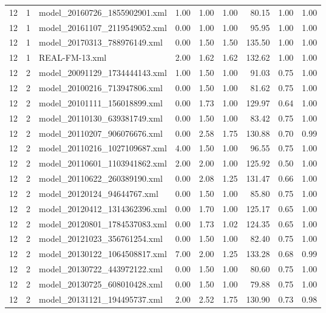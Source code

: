 \begin{table}[ht]
\begin{tabular}{rrlrrrrrr}
   12 &   1 & model\_20160726\_1855902901.xml & 1.00 & 1.00 & 1.00 & 80.15 & 1.00 & 1.00 \\ 
   12 &   1 & model\_20161107\_2119549052.xml & 0.00 & 1.00 & 1.00 & 95.95 & 1.00 & 1.00 \\ 
   12 &   1 & model\_20170313\_788976149.xml & 0.00 & 1.50 & 1.50 & 135.50 & 1.00 & 1.00 \\ 
   12 &   1 & REAL-FM-13.xml & 2.00 & 1.62 & 1.62 & 132.62 & 1.00 & 1.00 \\ 
   12 &   2 & model\_20091129\_1734444143.xml & 1.00 & 1.50 & 1.00 & 91.03 & 0.75 & 1.00 \\ 
   12 &   2 & model\_20100216\_713947806.xml & 0.00 & 1.50 & 1.00 & 81.62 & 0.75 & 1.00 \\ 
   12 &   2 & model\_20101111\_156018899.xml & 0.00 & 1.73 & 1.00 & 129.97 & 0.64 & 1.00 \\ 
   12 &   2 & model\_20110130\_639381749.xml & 0.00 & 1.50 & 1.00 & 83.42 & 0.75 & 1.00 \\ 
   12 &   2 & model\_20110207\_906076676.xml & 0.00 & 2.58 & 1.75 & 130.88 & 0.70 & 0.99 \\ 
   12 &   2 & model\_20110216\_1027109687.xml & 4.00 & 1.50 & 1.00 & 96.55 & 0.75 & 1.00 \\ 
   12 &   2 & model\_20110601\_1103941862.xml & 2.00 & 2.00 & 1.00 & 125.92 & 0.50 & 1.00 \\ 
   12 &   2 & model\_20110622\_260389190.xml & 0.00 & 2.08 & 1.25 & 131.47 & 0.66 & 1.00 \\ 
   12 &   2 & model\_20120124\_94644767.xml & 0.00 & 1.50 & 1.00 & 85.80 & 0.75 & 1.00 \\ 
   12 &   2 & model\_20120412\_1314362396.xml & 0.00 & 1.70 & 1.00 & 125.17 & 0.65 & 1.00 \\ 
   12 &   2 & model\_20120801\_1784537083.xml & 0.00 & 1.73 & 1.02 & 124.35 & 0.65 & 1.00 \\ 
   12 &   2 & model\_20121023\_356761254.xml & 0.00 & 1.50 & 1.00 & 82.40 & 0.75 & 1.00 \\ 
   12 &   2 & model\_20130122\_1064508817.xml & 7.00 & 2.00 & 1.25 & 133.28 & 0.68 & 0.99 \\ 
   12 &   2 & model\_20130722\_443972122.xml & 0.00 & 1.50 & 1.00 & 80.60 & 0.75 & 1.00 \\ 
   12 &   2 & model\_20130725\_608010428.xml & 0.00 & 1.50 & 1.00 & 79.88 & 0.75 & 1.00 \\ 
   12 &   2 & model\_20131121\_194495737.xml & 2.00 & 2.52 & 1.75 & 130.90 & 0.73 & 0.98 \\ 

\end{tabular}
\end{table}
